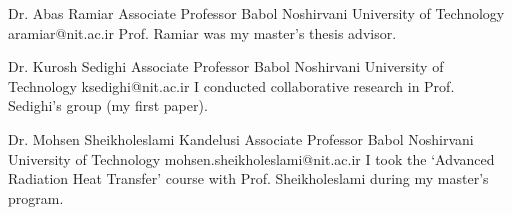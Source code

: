 
\vspace{5pt}

\begin{referees}\label{supervisor}
  {\label{recom:ramiar}
    Dr. Abas Ramiar
  }
  {Associate Professor}
  {Babol Noshirvani University of Technology}
  {aramiar@nit.ac.ir}
  {}
  {Prof. Ramiar was my master's thesis advisor.}

  \vspace{5pt}

  {Dr. Kurosh Sedighi}
  {Associate Professor}
  {Babol Noshirvani University of Technology}
  {ksedighi@nit.ac.ir}
  {}
  {I conducted collaborative research in Prof. Sedighi's group (my first paper).}

  \vspace{5pt}

  {Dr. Mohsen Sheikholeslami Kandelusi}
  {Associate Professor}
  {Babol Noshirvani University of Technology}
  {mohsen.sheikholeslami@nit.ac.ir}
  {}
  {I took the `Advanced Radiation Heat Transfer' course with Prof. Sheikholeslami during my master's program.}
\end{referees}
